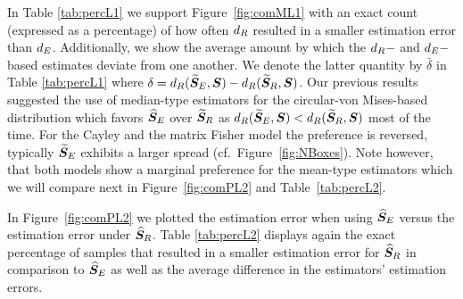 \noindent In Table \ref{tab:percL1} we support Figure~\ref{fig:comML1} with an exact count (expressed as a percentage) of how often ${d_R}$ resulted in a smaller estimation error than ${d_E}$.  Additionally, we show the average amount by which the ${d_R}-$ and ${d_E}-$based estimates deviate from one another.  We denote the latter quantity by $\bar\delta$ in Table \ref{tab:percL1} where  $\delta={d_R}({\widetilde{\bm S}_E},\bm S)-{d_R}({\widetilde{\bm S}_R},\bm S)$.    
Our previous results suggested the use of median-type estimators for the circular-von Mises-based distribution which favors ${\widehat{\bm S}_E}$ over ${\widetilde{\bm S}_R}$ as ${d_R}({\widetilde{\bm S}_E},\bm S) < {d_R}({\widetilde{\bm S}_R},\bm S)$ most of the time.  For the Cayley and the matrix Fisher model the preference is reversed, typically  ${\widetilde{\bm S}_E}$ exhibits a larger spread (cf.~Figure~\ref{fig:NBoxes}). Note however, that both models show a marginal preference for the mean-type estimators which we will compare next in Figure~\ref{fig:comPL2} and Table~\ref{tab:percL2}.



In Figure~\ref{fig:comPL2} we plotted the estimation error when using ${\widehat{\bm S}_E}$ versus the estimation error under ${\widehat{\bm S}_R}$. Table \ref{tab:percL2} displays again the exact percentage of samples that resulted in a smaller estimation error for ${\widehat{\bm S}_R}$ in comparison to ${\widehat{\bm S}_E}$ as well as the average difference in the estimators' estimation errors.

